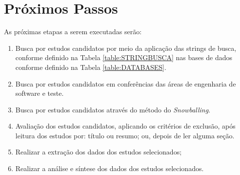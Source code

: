 \section{Próximos Passos}\label{sec:resultadosesperados}

As próximas etapas a serem executadas serão:

\begin{enumerate}

    \item Busca por estudos candidatos por meio da aplicação das strings de busca, conforme definido na Tabela \ref{table:STRINGBUSCA} nas bases de dados conforme definido na Tabela \ref{table:DATABASES}.
    
    \item Busca por estudos candidatos em conferências das áreas de engenharia de software e teste.
    
    \item Busca por estudos candidatos através do método do \textit{Snowballing}.

    \item Avaliação dos estudos candidatos, aplicando os critérios de exclusão, após leitura dos estudos por: título ou resumo; ou, depois de ler alguma seção.

    \item Realizar a extração dos dados dos estudos selecionados;
   
    \item Realizar a análise e síntese dos dados dos estudos selecionados.
\end{enumerate}




